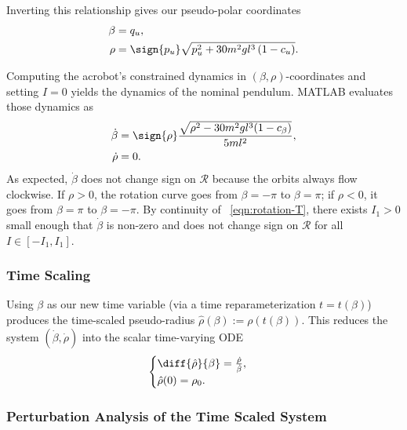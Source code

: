 Inverting this relationship gives our pseudo-polar coordinates
\begin{align}\label{eqn:rotation-T}
    \beta &= q_u
    , \\
    \rho &= \sign{p_u}\sqrt{p_u^2 + 30 m^2 g l^3 \left(1 - c_u \right)}
    .
\end{align}

Computing the acrobot's constrained dynamics in \((\beta,\rho)\)-coordinates and
setting \(I = 0\) yields the dynamics of the nominal pendulum.
MATLAB evaluates those dynamics as
\begin{align}
    \label{eqn:acrobot-rot-alpha-dot-nom}
    \dot{\beta} &=  \sign{\rho} 
    \frac{\sqrt{\rho^2 - 30m^2gl^3(1 - c_\beta)}}{5ml^2}
    , \\
    \label{eqn:acrobot-rot-mu-dot-nom}
    \dot{\rho} &= 0
    .
\end{align}
As expected, \(\dot{\beta}\) does not change sign on \(\mathcal{R}\) because the
orbits always flow clockwise.
If \(\rho > 0\), the rotation curve goes from \(\beta = -\pi\) to 
\(\beta = \pi\); 
if \(\rho < 0\), it goes from \(\beta = \pi\) to \(\beta = -\pi\).
By continuity of ~\eqref{eqn:rotation-T}, there exists \(I_1 > 0\) small enough
that \(\dot{\beta}\) is non-zero and does not change sign on \(\mathcal{R}\) for
all \(I \in [-I_1,I_1]\).

\subsubsection*{Time Scaling}

Using \(\beta\) as our new time variable (via a time reparameterization
\(t = t(\beta)\)) produces the time-scaled pseudo-radius
\(\hat{\rho}(\beta) := \rho(t(\beta))\).
This reduces the system \((\dot{\beta},\dot{\rho})\) into the scalar time-varying
ODE
\begin{equation}\label{eqn:rhohat-dot}
    \begin{cases}
        \diff{\hat{\rho}}{\beta} = \frac{\dot{\rho}}{\dot{\beta}}
        , \\
        \hat{\rho}(0) = \rho_0
        .
    \end{cases}
\end{equation}

\subsubsection*{Perturbation Analysis of the Time Scaled System}

